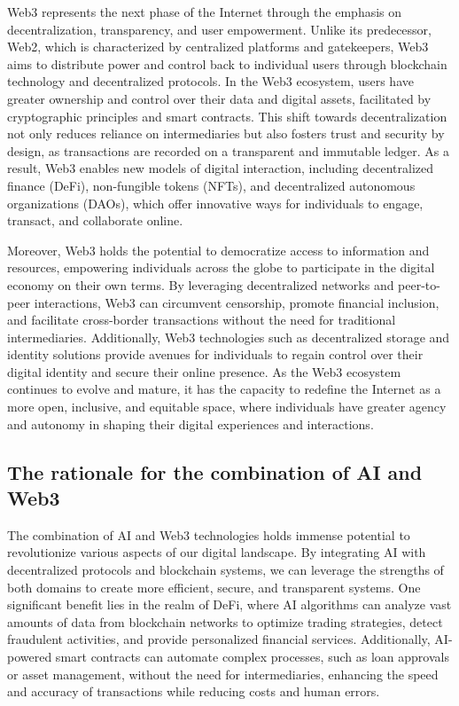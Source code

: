 \documentclass[conference]{IEEEtran}
\begin{document}
Web3 represents the next phase of the Internet through the emphasis on decentralization, transparency, and user empowerment. Unlike its predecessor, Web2, which is characterized by centralized platforms and gatekeepers, Web3 aims to distribute power and control back to individual users through blockchain technology and decentralized protocols. In the Web3 ecosystem, users have greater ownership and control over their data and digital assets, facilitated by cryptographic principles and smart contracts. This shift towards decentralization not only reduces reliance on intermediaries but also fosters trust and security by design, as transactions are recorded on a transparent and immutable ledger. As a result, Web3 enables new models of digital interaction, including decentralized finance (DeFi), non-fungible tokens (NFTs), and decentralized autonomous organizations (DAOs), which offer innovative ways for individuals to engage, transact, and collaborate online.

Moreover, Web3 holds the potential to democratize access to information and resources, empowering individuals across the globe to participate in the digital economy on their own terms. By leveraging decentralized networks and peer-to-peer interactions, Web3 can circumvent censorship, promote financial inclusion, and facilitate cross-border transactions without the need for traditional intermediaries. Additionally, Web3 technologies such as decentralized storage and identity solutions provide avenues for individuals to regain control over their digital identity and secure their online presence. As the Web3 ecosystem continues to evolve and mature, it has the capacity to redefine the Internet as a more open, inclusive, and equitable space, where individuals have greater agency and autonomy in shaping their digital experiences and interactions.


\subsection{The rationale for the combination of AI and Web3}
The combination of AI and Web3 technologies holds immense potential to revolutionize various aspects of our digital landscape. By integrating AI with decentralized protocols and blockchain systems, we can leverage the strengths of both domains to create more efficient, secure, and transparent systems. One significant benefit lies in the realm of DeFi, where AI algorithms can analyze vast amounts of data from blockchain networks to optimize trading strategies, detect fraudulent activities, and provide personalized financial services. Additionally, AI-powered smart contracts can automate complex processes, such as loan approvals or asset management, without the need for intermediaries, enhancing the speed and accuracy of transactions while reducing costs and human errors.
\end{document}
